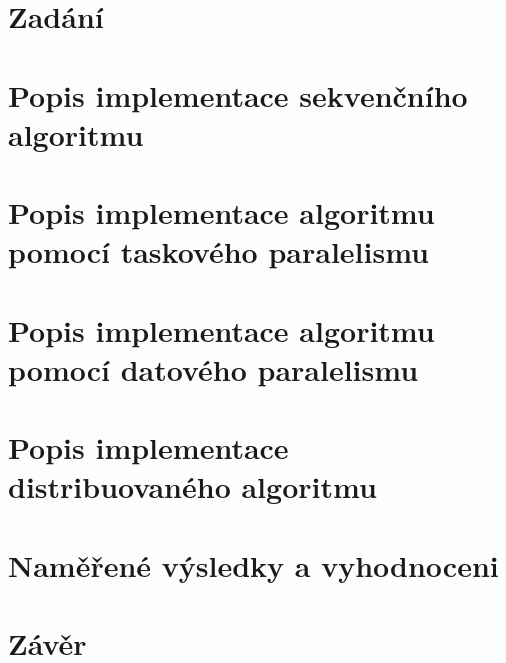 

\section{Zadání}


\section{Popis implementace sekvenčního algoritmu}


\section{Popis implementace algoritmu pomocí taskového paralelismu}


\section{Popis implementace algoritmu pomocí datového paralelismu}


\section{Popis implementace distribuovaného algoritmu}


\section{Naměřené výsledky a vyhodnoceni}


\section{Závěr}




